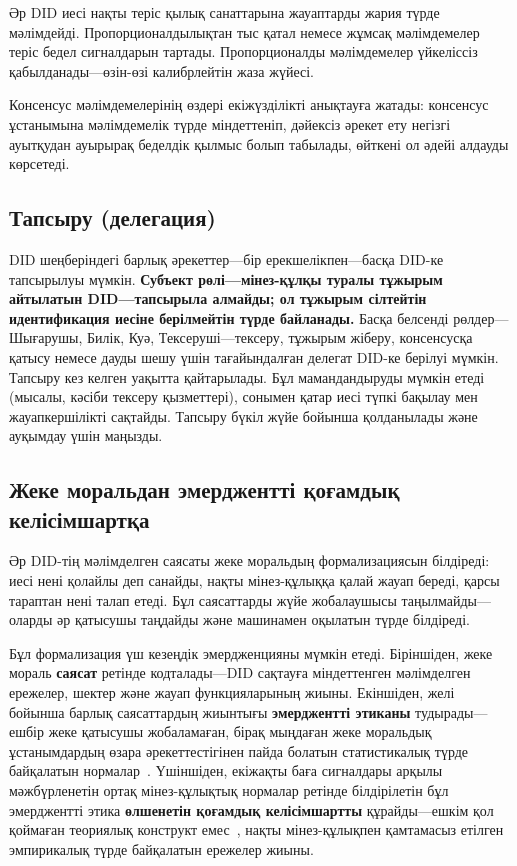 \documentclass[11pt,a4paper,twocolumn]{article}
\begin{document}
Әр DID иесі нақты теріс қылық санаттарына жауаптарды жария түрде мәлімдейді. Пропорционалдылықтан тыс қатал немесе жұмсақ мәлімдемелер теріс бедел сигналдарын тартады. Пропорционалды мәлімдемелер үйкеліссіз қабылданады---өзін-өзі калибрлейтін жаза жүйесі.

Консенсус мәлімдемелерінің өздері екіжүзділікті анықтауға жатады: консенсус ұстанымына мәлімдемелік түрде міндеттеніп, дәйексіз әрекет ету негізгі ауытқудан ауырырақ беделдік қылмыс болып табылады, өйткені ол әдейі алдауды көрсетеді.

\subsection{Тапсыру (делегация)}

DID шеңберіндегі барлық әрекеттер---бір ерекшелікпен---басқа DID-ке тапсырылуы мүмкін. \textbf{Субъект рөлі---мінез-құлқы туралы тұжырым айтылатын DID---тапсырыла алмайды; ол тұжырым сілтейтін идентификация иесіне берілмейтін түрде байланады.} Басқа белсенді рөлдер---Шығарушы, Билік, Куә, Тексеруші---тексеру, тұжырым жіберу, консенсусқа қатысу немесе дауды шешу үшін тағайындалған делегат DID-ке берілуі мүмкін. Тапсыру кез келген уақытта қайтарылады. Бұл мамандандыруды мүмкін етеді (мысалы, кәсіби тексеру қызметтері), сонымен қатар иесі түпкі бақылау мен жауапкершілікті сақтайды. Тапсыру бүкіл жүйе бойынша қолданылады және ауқымдау үшін маңызды.

\subsection{Жеке моральдан эмерджентті қоғамдық келісімшартқа}

Әр DID-тің мәлімделген саясаты жеке моральдың формализациясын білдіреді: иесі нені қолайлы деп санайды, нақты мінез-құлыққа қалай жауап береді, қарсы тараптан нені талап етеді. Бұл саясаттарды жүйе жобалаушысы таңылмайды---оларды әр қатысушы таңдайды және машинамен оқылатын түрде білдіреді.

Бұл формализация үш кезеңдік эмердженцияны мүмкін етеді. Біріншіден, жеке мораль \textbf{саясат} ретінде кодталады---DID сақтауға міндеттенген мәлімделген ережелер, шектер және жауап функцияларының жиыны. Екіншіден, желі бойынша барлық саясаттардың жиынтығы \textbf{эмерджентті этиканы} тудырады---ешбір жеке қатысушы жобаламаған, бірақ мыңдаған жеке моральдық ұстанымдардың өзара әрекеттестігінен пайда болатын статистикалық түрде байқалатын нормалар~\cite{durkheim1893}. Үшіншіден, екіжақты баға сигналдары арқылы мәжбүрленетін ортақ мінез-құлықтық нормалар ретінде білдірілетін бұл эмерджентті этика \textbf{өлшенетін қоғамдық келісімшартты} құрайды---ешкім қол қоймаған теориялық конструкт емес~\cite{rawls1971}, нақты мінез-құлықпен қамтамасыз етілген эмпирикалық түрде байқалатын ережелер жиыны.
\end{document}
